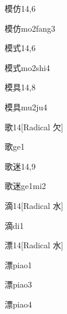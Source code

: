 \begin{entry}{模仿}{14,6}
  \begin{phonetics}{模仿}{mo2fang3}
  \end{phonetics}
\end{entry}

\begin{entry}{模式}{14,6}
  \begin{phonetics}{模式}{mo2shi4}
  \end{phonetics}
\end{entry}

\begin{entry}{模具}{14,8}
  \begin{phonetics}{模具}{mu2ju4}
  \end{phonetics}
\end{entry}

\begin{entry}{歌}{14}[Radical ⽋]
  \begin{phonetics}{歌}{ge1}
  \end{phonetics}
\end{entry}

\begin{entry}{歌迷}{14,9}
  \begin{phonetics}{歌迷}{ge1mi2}
  \end{phonetics}
\end{entry}

\begin{entry}{滴}{14}[Radical 水]
  \begin{phonetics}{滴}{di1}
  \end{phonetics}
\end{entry}

\begin{entry}{漂}{14}[Radical 水]
  \begin{phonetics}{漂}{piao1}
  \end{phonetics}
  \begin{phonetics}{漂}{piao3}
  \end{phonetics}
  \begin{phonetics}{漂}{piao4}
  \end{phonetics}
\end{entry}

